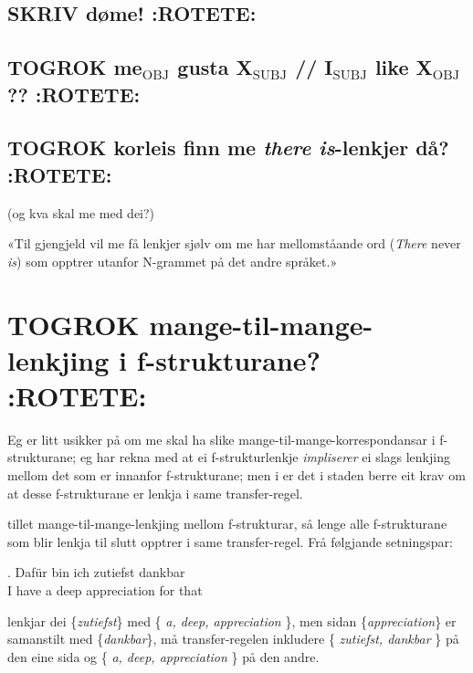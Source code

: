 \documentclass[11pt,a4paper,oneside,draft]{book}
\begin{document}
\subsection{\textbf{SKRIV} døme! \textbf{:ROTETE:}}
\label{sec-3.9.1}

\subsection{\textbf{TOGROK} me$_{\mathrm{OBJ}}$ gusta X$_{\mathrm{SUBJ}}$ // I$_{\mathrm{SUBJ}}$ like X$_{\mathrm{OBJ}}$ ?? \textbf{:ROTETE:}}
\label{sec-3.9.2}

\subsection{\textbf{TOGROK} korleis finn me \emph{there is}-lenkjer då? \textbf{:ROTETE:}}
\label{sec-3.9.3}

(og kva skal me med dei?)

«Til gjengjeld vil me få lenkjer sjølv om me har mellomståande ord
(\emph{There} never \emph{is}) som opptrer utanfor N-grammet på det andre
språket.»

\section{\textbf{TOGROK} mange-til-mange-lenkjing i f-strukturane? \textbf{:ROTETE:}}
\label{sec-3.10}

    Eg er litt usikker på om me skal ha slike
    mange-til-mange-korrespondansar i f-strukturane; eg har rekna med
    at ei f-strukturlenkje \emph{impliserer} ei slags lenkjing mellom det som
    er innanfor f-strukturane; men i \citet{riezler2006gmt} er det i
    staden berre eit krav om at desse f-strukturane er lenkja i same
    transfer-regel.


\citet[s.~40--41]{riezler2006gmt} tillet mange-til-mange-lenkjing
mellom f-strukturar, så lenge alle f-strukturane som blir lenkja til
slutt opptrer i same transfer-regel. Frå følgjande setningspar:

\ex. Dafür bin ich zutiefst dankbar \\
     I have a deep appreciation for that

lenkjar dei \{\emph{zutiefst}\} med \{ \emph{a, deep, appreciation} \}, men
sidan \{\emph{appreciation}\} er samanstilt med \{\emph{dankbar}\}, må
transfer-regelen inkludere \{ \emph{zutiefst, dankbar} \} på den eine sida
og \{ \emph{a, deep, appreciation} \} på den andre.
\end{document}
